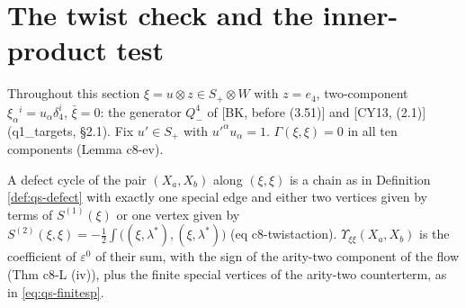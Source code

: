 \section{The twist check and the inner-product test}
\label{sec:qs-twist}

Throughout this section $\xi=u\otimes z\in S_+\otimes W$ with $z=e_4$, two-component $\xi_\alpha{}^i=u_\alpha\delta^i_4$, $\bar\xi=0$: the generator $Q^4_-$ of [BK, before (3.51)] and [CY13, (2.1)] (q1\_targets, §2.1). Fix $u'\in S_+$ with $u'^\alpha u_\alpha=1$. $\Gamma(\xi,\xi)=0$ in all ten components (Lemma c8-ev).

\begin{definition}
\label{def:qs-arity2}
A defect cycle of the pair $(X_a,X_b)$ along $(\xi,\xi)$ is a chain as in Definition \ref{def:qs-defect} with exactly one special edge and either two vertices given by terms of $S^{(1)}(\xi)$ or one vertex given by $S^{(2)}(\xi,\xi)=-\tfrac12\int\big((\xi,\lambda^*),(\xi,\lambda^*)\big)$ (eq c8-twistaction). $\Upsilon_{\xi\xi}(X_a,X_b)$ is the coefficient of $\varepsilon^0$ of their sum, with the sign of the arity-two component of the flow (Thm c8-L (iv)), plus the finite special vertices of the arity-two counterterm, as in \eqref{eq:qs-finitesp}.
\end{definition}

